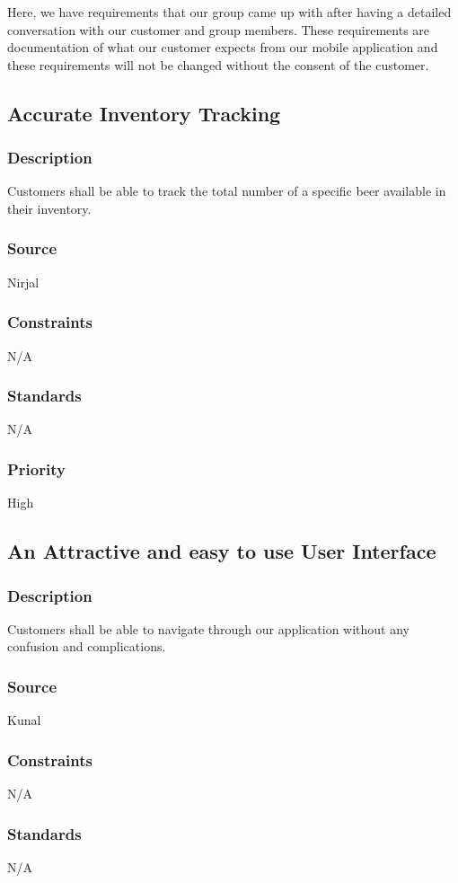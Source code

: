 Here, we have requirements that our group came up with after having a detailed conversation with our customer and group members. These requirements are documentation of what our customer expects from our mobile application and these requirements will not be changed without the consent of the customer. 

\subsection{Accurate Inventory Tracking}
\subsubsection{Description}
Customers shall be able to track the total number of a specific beer available in their inventory.
\subsubsection{Source}
Nirjal
\subsubsection{Constraints}
N/A
\subsubsection{Standards}
N/A
\subsubsection{Priority}
High

\subsection{An Attractive and easy to use User Interface}
\subsubsection{Description}
Customers shall be able to navigate through our application without any confusion and complications.
\subsubsection{Source}
Kunal
\subsubsection{Constraints}
N/A
\subsubsection{Standards}
N/A
